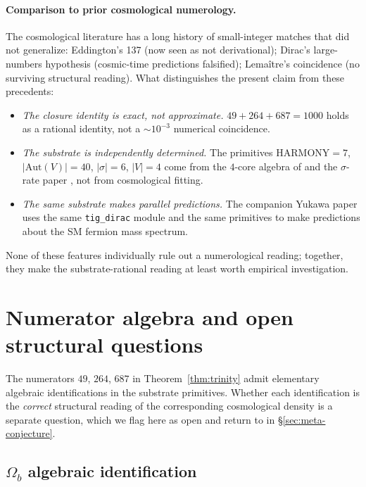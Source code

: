 \documentclass[11pt,reqno]{amsart}
\theoremstyle{plain}
\theoremstyle{definition}
\theoremstyle{remark}
\newcommand{\Aut}{\mathrm{Aut}}
\begin{document}
\paragraph{Comparison to prior cosmological numerology.}
The cosmological literature has a long history of small-integer
matches that did not generalize: Eddington's 137 (now seen as
not derivational); Dirac's large-numbers hypothesis (cosmic-time
predictions falsified); Lemaître's coincidence (no surviving
structural reading). What distinguishes the present claim from
these precedents:
\begin{itemize}
\item \emph{The closure identity is exact, not approximate.}
$49 + 264 + 687 = 1000$ holds as a rational identity, not a
$\sim 10^{-3}$ numerical coincidence.
\item \emph{The substrate is independently determined.} The
primitives $\mathrm{HARMONY} = 7$, $|\Aut(V)| = 40$, $|\sigma| = 6$,
$|V| = 4$ come from the $4$-core algebra of
\cite{SandersGish2026FourCore} and the $\sigma$-rate paper
\cite{SandersGish2026SigmaRate}, not from cosmological fitting.
\item \emph{The same substrate makes parallel predictions.} The
companion Yukawa paper \cite{SandersJohnson2026Yukawa} uses the
same \texttt{tig\_dirac} module and the same primitives to make
predictions about the SM fermion mass spectrum.
\end{itemize}
None of these features individually rule out a numerological
reading; together, they make the substrate-rational reading at
least worth empirical investigation.

\section{Numerator algebra and open structural questions}\label{sec:derivations}

The numerators $49$, $264$, $687$ in
Theorem~\ref{thm:trinity} admit elementary algebraic identifications
in the substrate primitives. Whether each identification is the
\emph{correct} structural reading of the corresponding cosmological
density is a separate question, which we flag here as open and
return to in \S\ref{sec:meta-conjecture}.

\subsection{$\Omega_b$ algebraic identification}
\end{document}
